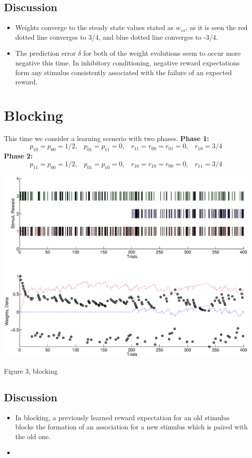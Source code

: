 \documentclass{article}
\begin{document}
\subsection{Discussion}
\begin{itemize}
\item Weights converge to the steady state values stated as $w_{ss}$, as it is seen the red dotted line converges to 3/4, and blue dotted line converges to -3/4.
\item The prediction error $\delta$ for both of the weight evolutions seem to occur more negative this time. In inhibitory conditioning, negative reward expectations form any stimulus consistently associated with the failure of an expected reward.
\end{itemize}
\section{Blocking}
This time we consider a learning scenerio with two phases.\newline
\textbf{Phase 1:}
\begin{equation*}
 p_{10}=p_{00}=1/2, \;\;\; p_{01}=p_{11}=0,\;\;\;r_{11}=r_{00}=r_{01}=0, \;\;\; r_{10}=3/4
\end{equation*}
\textbf{Phase 2:}
\begin{equation*}
 p_{11}=p_{00}=1/2, \;\;\; p_{01}=p_{10}=0,\;\;\;r_{10}=r_{10}=r_{00}=0, \;\;\; r_{11}=3/4
\end{equation*}
\begin{center}
\includegraphics[width=\textwidth]{block.eps}
\begin{footnotesize}
 Figure 3, blocking
\end{footnotesize}
\end{center}
\subsection{Discussion}
\begin{itemize}
\item In blocking, a previously learned reward expectation for an old stimulus blocks the formation of an association for a new stimulus which is paired with the old one.
\item 
\end{itemize}
\end{document}
